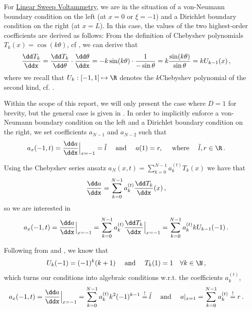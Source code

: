 \documentclass{prettytex/ox/mmsc-special-topic}
\begin{document}
  For \underline{Linear Sweep Voltammetry}, we are in the situation of a von-Neumann boundary condition on the left (at $x = 0$ or $\xi = -1$) and a Dirichlet boundary condition on the right (at $x = L$).
  In this case, the values of the two highest-order coefficients are derived as follows:
  From the definition of Chebyshev polynomials $T_k(x) = \cos(k\theta)$, cf , we can derive that
  $$\frac{\dd T_k}{\ddx} = \frac{\dd T_k}{\dd\theta} \cdot \frac{\dd\theta}{\ddx} = -k \sin(k\theta) \cdot \frac{1}{-\sin \theta} = k \frac{\sin(k\theta)}{\sin \theta} = k U_{k-1}(x)\,,$$
  where we recall that $U_k: [-1, 1] \mapsto \R$ denotes the $k$\th Chebyshev polynomial of the second kind, cf. .

  Within the scope of this report, we will only present the case where $D = 1$ for brevity, but the general case is given in .
  In order to implicitly enforce a von-Neumann boundary condition on the left and a Dirichlet boundary condition on the right, we set coefficients $a_{N-1}$ and $a_{N-2}$ such that
  $$a_x(-1, t) = \frac{\dd a}{\ddx}\Big|_{x=-1} = \tilde{l} \quad \text{ and } \quad a(1) = r, \quad \text{ where } \quad \tilde{l}, r \in \R\,.$$

  Using the Chebyshev series ansatz
  $a_N(x, t) = \sum_{k=0}^{N-1} a_k^{(t)} T_k(x)$
  we have that
  $$\frac{\dd a}{\ddx} = \sum_{k=0}^{N-1} a_k^{(t)} \frac{\dd T_k}{\ddx}(x)\,,$$
  so we are interested in
  $$a_x(-1, t) = \frac{\dd a}{\ddx}\Big|_{x=-1} = \sum_{k=0}^{N-1} a_k^{(t)} \frac{\dd T_k}{\ddx}\Big|_{x=-1} = \sum_{k=0}^{N-1} a_k^{(t)} k U_{k-1}(-1)\,.$$

  Following from  and , we know that
  $$U_k(-1) = (-1)^k (k+1) \quad \text{ and } \quad T_k(1) = 1 \quad \forall k \in \N\,,$$
  which turns our conditions into algebraic conditions w.r.t. the coefficients $a_k^{(t)}$,
  $$a_x(-1, t) = \frac{\dd a}{\ddx}\Big|_{x=-1} = \sum_{k=0}^{N-1} a_k^{(t)} k^2 (-1)^{k-1} \overset{!}{=} \tilde{l} \quad \text{ and } \quad a|_{x=1} = \sum_{k=0}^{N-1} a_k^{(t)} \overset{!}{=} r\,.$$
\end{document}
